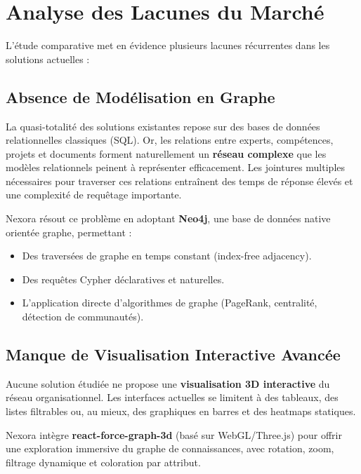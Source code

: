 \documentclass[12pt,a4paper]{article}
\begin{document}
\section{Analyse des Lacunes du Marché}

L'étude comparative met en évidence plusieurs lacunes récurrentes dans les solutions actuelles :

\subsection{Absence de Modélisation en Graphe}

La quasi-totalité des solutions existantes repose sur des bases de données relationnelles classiques (SQL). Or, les relations entre experts, compétences, projets et documents forment naturellement un \textbf{réseau complexe} que les modèles relationnels peinent à représenter efficacement. Les jointures multiples nécessaires pour traverser ces relations entraînent des temps de réponse élevés et une complexité de requêtage importante.

Nexora résout ce problème en adoptant \textbf{Neo4j}, une base de données native orientée graphe, permettant :
\begin{itemize}[leftmargin=*]
    \item Des traversées de graphe en temps constant (index-free adjacency).
    \item Des requêtes Cypher déclaratives et naturelles.
    \item L'application directe d'algorithmes de graphe (PageRank, centralité, détection de communautés).
\end{itemize}

\subsection{Manque de Visualisation Interactive Avancée}

Aucune solution étudiée ne propose une \textbf{visualisation 3D interactive} du réseau organisationnel. Les interfaces actuelles se limitent à des tableaux, des listes filtrables ou, au mieux, des graphiques en barres et des heatmaps statiques.

Nexora intègre \textbf{react-force-graph-3d} (basé sur WebGL/Three.js) pour offrir une exploration immersive du graphe de connaissances, avec rotation, zoom, filtrage dynamique et coloration par attribut.
\end{document}
